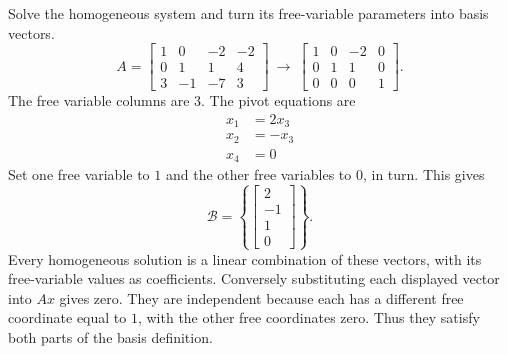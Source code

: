 \goal Solve the homogeneous system and turn its free-variable parameters into basis vectors.
\[A=\left[\begin{array}{rrrr}1&0&-2&-2\\0&1&1&4\\3&-1&-7&3\end{array}\right]\ \longrightarrow\ \left[\begin{array}{rrrr}1&0&-2&0\\0&1&1&0\\0&0&0&1\end{array}\right].\]
The free variable columns are 3. The pivot equations are
\[\begin{aligned}x_{1}&=2 x_{3}\\x_{2}&=- x_{3}\\x_{4}&=0\end{aligned}\]
Set one free variable to $1$ and the other free variables to $0$, in turn. This gives
\[\mathcal B=\left\{\left[\begin{array}{r}2\\-1\\1\\0\end{array}\right]\right\}.\]
Every homogeneous solution is a linear combination of these vectors, with its free-variable values as coefficients. Conversely substituting each displayed vector into $Ax$ gives zero. They are independent because each has a different free coordinate equal to $1$, with the other free coordinates zero. Thus they satisfy both parts of the basis definition.

